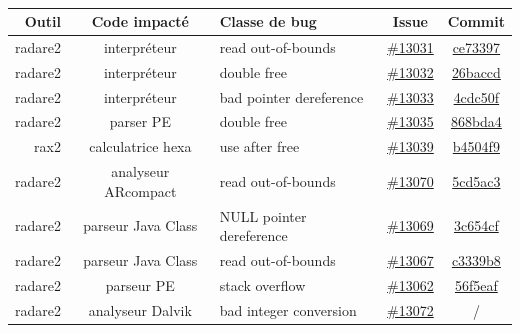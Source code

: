 \paragraph{}
\begin{tabularx}{\textwidth}{|r|c|X|c|c|}
    \hline
    \textbf{Outil} & \textbf{Code impacté} & \textbf{Classe de bug} & \textbf{Issue} & \textbf{Commit} \\
    \hline
    radare2 & interpréteur & read out-of-bounds & \href{https://github.com/radare/radare2/issues/13031}{\#13031} & \href{https://github.com/radare/radare2/commit/ce73397}{ce73397} \\
    \hline
    radare2 & interpréteur & double free & \href{https://github.com/radare/radare2/issues/13032}{\#13032} & \href{https://github.com/radare/radare2/commit/26baccd}{26baccd} \\
    \hline
    radare2 & interpréteur & bad pointer dereference & \href{https://github.com/radare/radare2/issues/13033}{\#13033} & \href{https://github.com/radare/radare2/commit/4cdc50f}{4cdc50f} \\
    \hline
    radare2 & parser PE & double free & \href{https://github.com/radare/radare2/issues/13035}{\#13035} & \href{https://github.com/radare/radare2/commit/868bda4}{868bda4} \\
    \hline
    rax2 & calculatrice hexa & use after free & \href{https://github.com/radare/radare2/issues/13039}{\#13039} & \href{https://github.com/radare/radare2/commit/b4504f9}{b4504f9} \\
    \hline
    radare2 & analyseur ARcompact & read out-of-bounds & \href{https://github.com/radare/radare2/issues/13070}{\#13070} & \href{https://github.com/radare/radare2/commit/5cd5ac3}{5cd5ac3} \\
    \hline
    radare2 & parseur Java Class & NULL pointer dereference & \href{https://github.com/radare/radare2/issues/13069}{\#13069} & \href{https://github.com/radare/radare2/commit/3c654cf}{3c654cf} \\
    \hline
    radare2 & parseur Java Class & read out-of-bounds & \href{https://github.com/radare/radare2/issues/13067}{\#13067} & \href{https://github.com/radare/radare2/commit/c3339b8}{c3339b8} \\
    \hline
    radare2 & parseur PE & stack overflow & \href{https://github.com/radare/radare2/issues/13062}{\#13062} & \href{https://github.com/radare/radare2/commit/56f5eaf}{56f5eaf} \\
    \hline
    radare2 & analyseur Dalvik & bad integer conversion & \href{https://github.com/radare/radare2/issues/13072}{\#13072} & / \\
    \hline

\end{tabularx}

